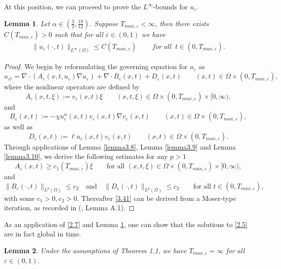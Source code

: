 \documentclass[12pt]{article}
\theoremstyle{plain}
\newtheorem{lemma}{Lemma}[section]
\theoremstyle{definition}
\numberwithin{equation}{section}
\begin{document}
At this position, we can  proceed to prove  the $L^\infty$-bounds for $u_{\varepsilon}$.
\begin{lemma}\label{lemma3.11}
Let $\alpha\in\left(\frac{3}{2},\frac{19}{12}\right)$. Suppose $T_{max,\varepsilon}<\infty$, then there exists
$C( T_{max,\varepsilon})>0$
 such that for all $\varepsilon\in(0,1)$ we have
\begin{align}\label{3.41}
   \|u_{\varepsilon}(\cdot,t)\|_{L^{\infty}(\Omega)}\leq C( T_{max,\varepsilon}) ~\qquad for\; all\; ~t\in (0,T_{max,\varepsilon}).
\end{align}
\end{lemma}
\begin{proof}
We begin by reformulating the governing equation for $u_\varepsilon$ as
$$u_{\varepsilon t}=\nabla\cdot\left(A_{\varepsilon}(x,t,u_{\varepsilon})\nabla u_{\varepsilon}\right)+\nabla\cdot B_{\varepsilon}(x,t)+D_{\varepsilon}(x,t) \qquad(x,t)\in\Omega\times(0,T_{max,\varepsilon}),$$
where the nonlinear operators are defined by
$$A_{\varepsilon}(x,t,\xi):=v_{\varepsilon}(x,t)\xi \qquad(x,t,\xi)\in\Omega\times (0,T_{max,\varepsilon})\times[0,\infty),$$
and
$$B_{\varepsilon}(x,t):=-\chi u_{\varepsilon}^{\alpha}(x,t)v_{\varepsilon}(x,t)\nabla v_{\varepsilon}(x,t)\qquad(x,t)\in\Omega\times(0,T_{max,\varepsilon}),$$
as well as
$$ D_{\varepsilon}(x,t):=\ell u_{\varepsilon}(x,t)v_{\varepsilon}(x,t) \qquad(x,t)\in\Omega\times(0,T_{max,\varepsilon}).$$
Through applications of Lemma \ref{lemma3.8}, Lemma \ref{lemma3.9} and Lemma \ref{lemma3.10}, we derive the following estimates for any $p > 1$
$$A_{\varepsilon}(x,t)\geq c_{1}(T_{max,\varepsilon})\xi\qquad\text{for all }(x,t,\xi)\in\Omega\times (0,T_{max,\varepsilon})\times[0,\infty),$$
and
$$\|B_{\varepsilon}(\cdot,t)\|_{L^{p}(\Omega)}\leq c_{2}\quad\text{and}\quad\|D_{\varepsilon}(\cdot,t)\|_{L^{p}(\Omega)}\leq c_2\qquad\text{for all }t\in(0,T_{max,\varepsilon}),$$
with some $c_1>0,c_2>0$. Thereafter  \eqref{3.41}  can be derived from  a Moser-type iteration, as recorded in (\cite{TaoW}, Lemma A.1).
\end{proof}

As an application of \eqref{2.7} and Lemma \ref{lemma3.11}, one can show that the solutions to \eqref{2.5} are in fact global in time.
\begin{lemma}\label{lemma3.12}Under the assumptions of Theorem 1.1, we  have
$T_{max,\varepsilon}=\infty$ for all $\varepsilon\in(0,1).$
\end{lemma}
\end{document}
